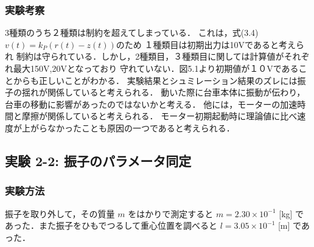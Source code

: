 \newpage

\subsubsection{実験考察}
3種類のうち２種類は制約を超えてしまっている．
これは，式(3.4)\(v(t) = k_P \left( r(t) - z(t) \right)\)のため
１種類目は初期出力は10Vであると考えられ
制約は守られている．しかし，2種類目，３種類目に関しては計算値がそれぞれ最大150V,20Vとなっており
守れていない．図5.1より初期値が１０Vであることからも正しいことがわかる．
実験結果とシュミレーション結果のズレには振子の揺れが関係していると考えられる．
動いた際に台車本体に振動が伝わり，台車の移動に影響があったのではないかと考える．
他には，モーターの加速時間と摩擦が関係していると考えられる．
モーター初期起動時に理論値に比べ速度が上がらなかったことも原因の一つであると考えられる．



\subsection{実験 2-2: 振子のパラメータ同定}
\subsubsection{実験方法}

振子を取り外して，その質量 \( m \) をはかりで測定すると \( m = 2.30 \times 10^{-1} \) [kg] であった．また振子をひもでつるして重心位置を調べると \( l = 3.05 \times 10^{-1} \) [m] であった．

